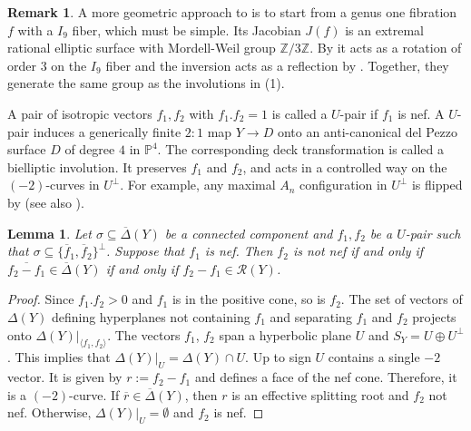 \documentclass[a4paper]{amsart}
\theoremstyle{definition}
\newtheorem{remark}[definition]{Remark}
\theoremstyle{plain}
\newtheorem{lemma}[definition]{Lemma}
\newcommand{\ZZ}{\mathbb{Z}}
\newcommand{\PP}{\mathbb{P}}
\newcommand{\R}{\mathcal{R}}
\newcommand{\DeltabarY}{\overline{\Delta}(Y)}
\begin{document}
\begin{remark}
A more geometric approach to  is to start from a genus one fibration $f$ with a $I_9$ fiber, which must be simple. Its Jacobian $J(f)$ is an extremal rational elliptic surface with Mordell-Weil group $\ZZ/3\ZZ$. By \cite[Corollary 2.3]{martin2024enriquessurfaceszeroentropy} it acts as a rotation of order $3$ on the $I_9$ fiber and the inversion acts as a reflection by \cite[Lemma 2.4]{martin2024enriquessurfaceszeroentropy}. Together, they generate the same group as the involutions in  (1).
\end{remark}


A pair of isotropic vectors $f_1,f_2$ with $f_1.f_2=1$ is called a $U$-pair if $f_1$ is nef. A $U$-pair induces a generically finite $2:1$ map $Y \to D$ onto an anti-canonical del Pezzo surface $D$ of degree $4$ in $\PP^4$. The corresponding deck transformation is called a bielliptic involution. It preserves $f_1$ and $f_2$, and acts in a controlled way on the $(-2)$-curves in $U^\perp$. For example, any maximal $A_n$ configuration in $U^\perp$ is flipped by \cite{shimada:salem} (see also \cite[Lemma 8.7.20]{enriquesII}).  
\begin{lemma}\label{lem:nef_Upair}
Let $\sigma \subseteq \DeltabarY$ be a connected component and $f_1,f_2$ be a $U$-pair such that $\sigma \subseteq \{\overline{f}_1,\overline{f}_2\}^\perp$. Suppose that $f_1$ is nef.
Then $f_2$ is not nef if and only if $\overline{f_2-f_1} \in \DeltabarY$ if and only if $f_2-f_1 \in \R(Y)$. 
\end{lemma}
\begin{proof}
Since $f_1.f_2>0$ and $f_1$ is in the positive cone, so is $f_2$.
The set of vectors of $\Delta(Y)$ defining hyperplanes not containing $f_1$ and separating $f_1$ and $f_2$ projects onto $\Delta(Y)|_{\langle f_1,f_2\rangle}$. 
The vectors $f_1$, $f_2$ span a hyperbolic plane $U$ and $S_Y = U \oplus U^\perp$.
This implies that $\Delta(Y)|_U = \Delta(Y) \cap U$. Up to sign $U$ contains a single $-2$ vector. It is given by $r:=f_2-f_1$ and defines a face of the nef cone. Therefore, it is a $(-2)$-curve. 
If $\overline{r} \in \DeltabarY$, then $r$ is an effective splitting root and $f_2$ not nef. Otherwise, $\Delta(Y)|_U = \emptyset$ and $f_2$ is nef.
\end{proof}
\end{document}
